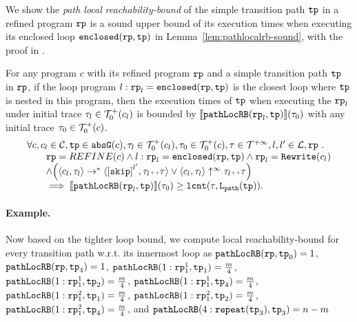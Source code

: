 We show the \emph{path local reachability-bound} of the simple transition path $\mathtt{tp}$ in a refined program $\mathtt{rp}$ is a sound upper bound of its execution times when executing its enclosed loop $\mathtt{enclosed}(\mathtt{rp}, \mathtt{tp})$ in Lemma~\ref{lem:pathlocalrb-sound}, with the proof in .
\begin{lem}
  \label{lem:pathlocalrb-sound}
  For any program $c$ with its refined program $\mathtt{rp}$ and a simple transition path $\mathtt{tp}$ in $\mathtt{rp}$,
  if the loop program $l: \mathtt{rp}_l = \mathtt{enclosed}(\mathtt{rp}, \mathtt{tp})$ is the closest loop where $\mathtt{tp}$ is nested in this program,
  then the execution times of $\mathtt{tp}$ when executing the $\mathtt{rp}_l$ under initial trace $\mathtt{\tau}_l \in \mathcal{T}^{+}_0(c_l)$ is bounded by $\llbracket \mathtt{pathLocRB}(\mathtt{rp}_l, \mathtt{tp}) \rrbracket(\mathtt{\tau}_0)$ with any initial trace $\mathtt{\tau}_0 \in \mathcal{T}^{+}_0(c)$.
  \[
    \begin{array}{l}
    \forall c, c_l \in \cdom, \tpath \in \absG(c), 
    \trace_l \in \ftdom_0(c_l), \trace_0 \in \ftdom_0(c), \trace \in \tdom, l, l' \in \ldom, \rprog \sthat 
    \\ \qquad
    \rprog = REFINE(c)
    \land
    l: \rprog_l = \kw{enclosed}(\rprog, \tpath)
    \land 
    \rprog_l = \algrewrite(c_l)
    \\ \qquad
    \land
    \Big(
    \config{c_l, \trace_l} \rightarrow^* \config{\clabel{\eskip}^{l'}, \trace_l \tracecat \trace}
    \lor \config{c_l, \trace_l} \uparrow^{\infty} \trace_l \tracecat \trace 
    \Big)
    \\ \qquad
    \implies
    \econfig{\outinB(\rprog_l, \tpath)}(\trace_0) \geq \lcounter(\trace, \pathl(\tpath)).
    \end{array}
  \]  
\end{lem}


\paragraph{Example.}
Now based on the tighter loop bound,
we compute local reachability-bound for every transition path w.r.t. its innermost loop as
$\mathtt{pathLocRB}(\mathtt{rp}, \mathtt{tp}_0) = 1$,
$\mathtt{pathLocRB}(\mathtt{rp}, \mathtt{tp}_4) = 1$,
$\mathtt{pathLocRB}(1: \mathtt{rp}_1^1, \mathtt{tp}_1) = \frac{m}{4}$,
$\mathtt{pathLocRB}(1: \mathtt{rp}_1^1, \mathtt{tp}_2) = \frac{m}{4}$,
$\mathtt{pathLocRB}(1: \mathtt{rp}_1^1, \mathtt{tp}_4) = \frac{m}{4}$,
$\mathtt{pathLocRB}(1: \mathtt{rp}_1^2, \mathtt{tp}_1) = \frac{m}{4}$,
$\mathtt{pathLocRB}(1: \mathtt{rp}_1^2, \mathtt{tp}_2) = \frac{m}{4}$,
$\mathtt{pathLocRB}(1: \mathtt{rp}_1^2, \mathtt{tp}_4) = \frac{m}{4}$, and
$\mathtt{pathLocRB}(4: \mathtt{repeat}(\mathtt{tp}_3), \mathtt{tp}_3) = n - m$ 

